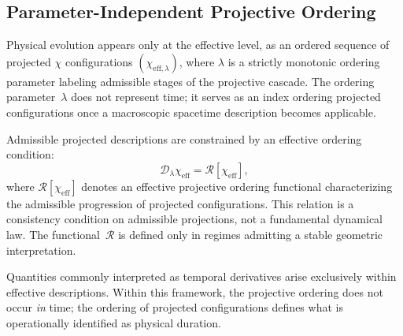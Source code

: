 \subsection{Parameter-Independent Projective Ordering}
  \label{subsec:parameter-independent-relaxation}

  Physical evolution appears only at the effective level, as an ordered
  sequence of projected $\chi$ configurations
  $(\chi_{\mathrm{eff},\lambda})$, where $\lambda$ is a strictly monotonic
  ordering parameter labeling admissible stages of the projective cascade.
  The ordering parameter~$\lambda$ does not represent time; it serves as an
  index ordering projected configurations once a macroscopic spacetime
  description becomes applicable.

  Admissible projected descriptions are constrained by an effective
  ordering condition:
  \begin{equation}
    \mathcal{D}_{\lambda}\chi_{\mathrm{eff}}
    = \mathcal{R}[\chi_{\mathrm{eff}}] ,
  \end{equation}
  where $\mathcal{R}[\chi_{\mathrm{eff}}]$ denotes an effective projective
  ordering functional characterizing the admissible progression of projected
  configurations.
  This relation is a consistency condition on admissible projections, not a
  fundamental dynamical law.
  The functional~$\mathcal{R}$ is defined only in regimes admitting a stable
  geometric interpretation.

  Quantities commonly interpreted as temporal derivatives arise exclusively
  within effective descriptions.
  Within this framework, the projective ordering does not occur \emph{in}
  time; the ordering of projected configurations defines what is
  operationally identified as physical duration.
